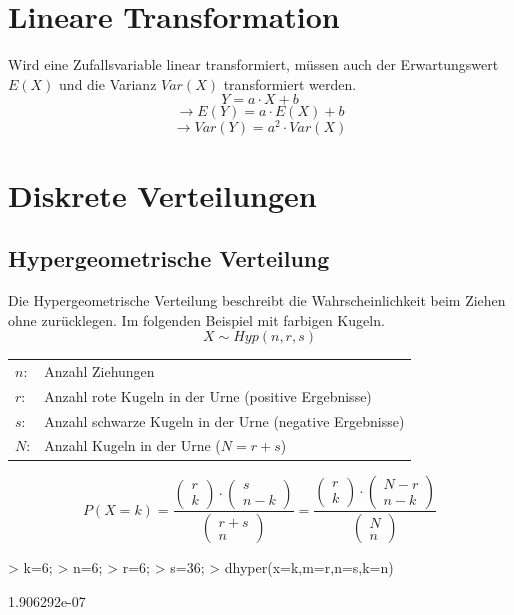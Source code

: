 \newpage
\section{Lineare Transformation}
Wird eine Zufallsvariable linear transformiert, müssen auch der Erwartungswert 
$E(X)$ und die Varianz $Var(X)$ transformiert werden. 
\[ Y = a \cdot X + b \]
\[ \rightarrow E(Y) = a \cdot E(X) + b \]
\[ \rightarrow Var(Y) = a^2 \cdot Var(X) \]

\section{Diskrete Verteilungen}

\subsection{Hypergeometrische Verteilung}
Die Hypergeometrische Verteilung beschreibt die Wahrscheinlichkeit beim 
Ziehen ohne zurücklegen. Im folgenden Beispiel mit farbigen Kugeln. 
\[ X \sim Hyp(n, r, s) \]
\begin{tabular}{@{}ll}
  $n$: & Anzahl Ziehungen \\
  $r$: & Anzahl rote Kugeln in der Urne (positive Ergebnisse) \\
  $s$: & Anzahl schwarze Kugeln in der Urne (negative Ergebnisse) \\
  $N$: & Anzahl Kugeln in der Urne ($N = r + s$)
\end{tabular}
\[ P(X=k) 
= \frac{\left( \begin{array}{c}r\\k\end{array} \right) \cdot 
\left( \begin{array}{c}s\\n-k\end{array} \right)}
{\left( \begin{array}{c}r+s\\n\end{array} \right)} 
= \frac{\left( \begin{array}{c}r\\k\end{array} \right) \cdot 
\left( \begin{array}{c}N-r\\n-k\end{array} \right)}
{\left( \begin{array}{c}N\\n\end{array} \right)} \]
\begin{Schunk}
\begin{Sinput}
> k=6;
> n=6;
> r=6;
> s=36;
> dhyper(x=k,m=r,n=s,k=n)
\end{Sinput}
\begin{Soutput}
[1] 1.906292e-07
\end{Soutput}
\end{Schunk}
